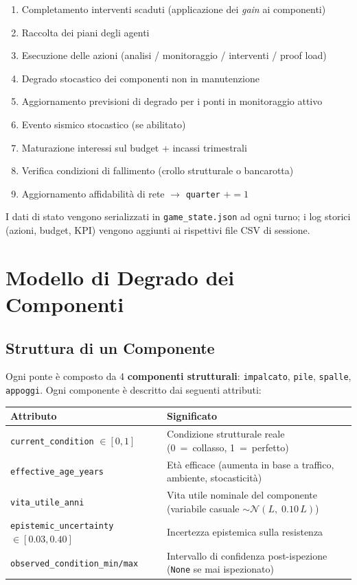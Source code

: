 \documentclass[11pt,a4paper]{article}
\begin{document}
\begin{enumerate}
  \item Completamento interventi scaduti (applicazione dei \textit{gain} ai componenti)
  \item Raccolta dei piani degli agenti
  \item Esecuzione delle azioni (analisi / monitoraggio / interventi / proof load)
  \item Degrado stocastico dei componenti non in manutenzione
  \item Aggiornamento previsioni di degrado per i ponti in monitoraggio attivo
  \item Evento sismico stocastico (se abilitato)
  \item Maturazione interessi sul budget + incassi trimestrali
  \item Verifica condizioni di fallimento (crollo strutturale o bancarotta)
  \item Aggiornamento affidabilit\`a di rete $\rightarrow$ \texttt{quarter} $+= 1$
\end{enumerate}

I dati di stato vengono serializzati in \texttt{game\_state.json} ad ogni turno; i log storici (azioni, budget, KPI) vengono aggiunti ai rispettivi file CSV di sessione.

\section{Modello di Degrado dei Componenti}

\subsection{Struttura di un Componente}

Ogni ponte \`e composto da 4 \textbf{componenti strutturali}: \texttt{impalcato}, \texttt{pile}, \texttt{spalle}, \texttt{appoggi}. Ogni componente \`e descritto dai seguenti attributi:

\begin{center}
\begin{tabular}{lp{9cm}}
\toprule
\textbf{Attributo} & \textbf{Significato} \\
\midrule
\texttt{current\_condition} $\in [0,1]$ & Condizione strutturale reale (0~=~collasso, 1~=~perfetto) \\
\texttt{effective\_age\_years} & Et\`a efficace (aumenta in base a traffico, ambiente, stocasticit\`a) \\
\texttt{vita\_utile\_anni} & Vita utile nominale del componente (variabile casuale $\sim \mathcal{N}(L,\; 0.10\,L)$) \\
\texttt{epistemic\_uncertainty} $\in [0.03, 0.40]$ & Incertezza epistemica sulla resistenza \\
\texttt{observed\_condition\_min/max} & Intervallo di confidenza post-ispezione (\texttt{None} se mai ispezionato) \\
\bottomrule
\end{tabular}
\end{center}
\end{document}
